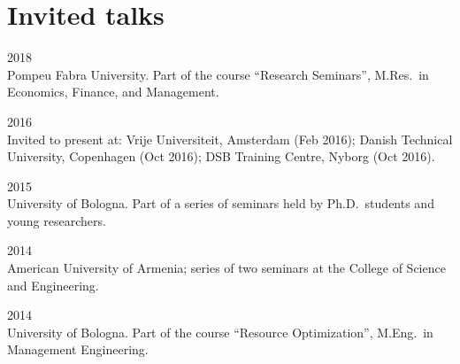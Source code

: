 \section*{Invited talks}

\begin{paracol}{2}
  \textsc{2018}
\switchcolumn
  \\
  Pompeu Fabra University. Part of the course ``Research Seminars'', M.Res.\ in Economics, Finance, and Management.
\end{paracol}

\begin{paracol}{2}
  \textsc{2016}
\switchcolumn
  \\
  Invited to present at: Vrije Universiteit, Amsterdam (Feb 2016); Danish Technical University, Copenhagen (Oct 2016); DSB Training Centre, Nyborg (Oct 2016).
\end{paracol}

\begin{paracol}{2}
  \textsc{2015}
\switchcolumn
  \\
  University of Bologna. Part of a series of seminars held by Ph.D.\ students and young researchers.
\end{paracol}

\begin{paracol}{2}
  \textsc{2014}
\switchcolumn
  \\
  American University of Armenia; series of two seminars at the College of Science and Engineering.
\end{paracol}

\begin{paracol}{2}
  \textsc{2014}
\switchcolumn
  \\
  University of Bologna. Part of the course ``Resource Optimization'', M.Eng.\ in Management Engineering.
\end{paracol}
